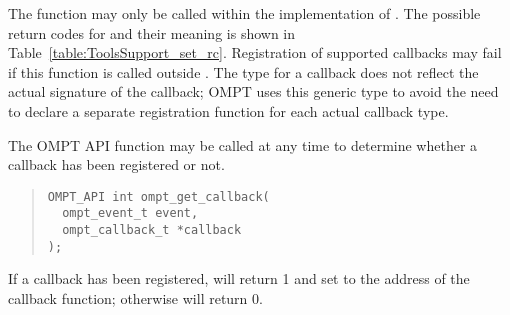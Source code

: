 \noindent
The  function  may only be called within the implementation of .
The possible return codes for  and their meaning is shown in Table~\ref{table:ToolsSupport_set_rc}.
Registration of supported callbacks may fail if this function is called outside  .
The  type for a callback does not reflect the actual signature of the callback; OMPT uses this generic type to avoid the need to declare a separate registration function for each actual callback type.

The OMPT API function  may be called at any time to determine whether a callback has been registered or not. 

\begin{quote}
\begin{verbatim}
OMPT_API int ompt_get_callback(
  ompt_event_t event, 
  ompt_callback_t *callback
);
\end{verbatim}
\end{quote}

\noindent
If a callback has been registered,  will return 1 and set  to the address of the callback function; otherwise  will return 0.

